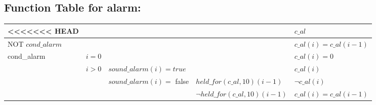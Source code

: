 \documentclass[fontsize=12pt,paper=letter,twoside]{scrartcl}
\begin{document}
\subsection{Function Table for alarm: }
\begin{table}[htb!]
\centering
\label{my-label}
\begin{tabular}{llll|l|}
<<<<<<< HEAD
\cline{5-5}
                                                   &                                       &                                                               &                               & $c\_al$                 \\ \hline
\multicolumn{4}{|l|}{NOT $cond\_alarm$}                                                                                                                                                       &  $c\_al(i) = c\_al(i-1)$ \\ \hline
\multicolumn{1}{|l|}{\multirow{4}{*}{cond\_alarm}} & \multicolumn{1}{l|}{$i = 0$}            & \multicolumn{1}{l|}{}                                         &                               & $c\_al(i) = 0$          \\ \cline{2-5}
\multicolumn{1}{|l|}{}                             & \multicolumn{1}{l|}{$i > 0$} & \multicolumn{2}{l|}{$sound\_alarm(i) = true$}                                                   & $c\_al(i)$              \\ \cline{2-5}
\multicolumn{1}{|l|}{}                             & \multicolumn{1}{l|}{}                 & \multicolumn{1}{l|}{\multirow{2}{*}{$sound\_alarm(i) =$ false}} & $held\_for(c\_al, 10)(i-1)$     & $\neg c\_al(i)$          \\ \cline{2-2} \cline{4-5}
\multicolumn{1}{|l|}{}                             & \multicolumn{1}{l|}{}                 & \multicolumn{1}{l|}{}                                         & $\neg held\_for(c\_al, 10)(i-1)$ & $c\_al(i) = c\_al(i-1)$ \\ \hline


\end{tabular}
\end{table}
\end{document}
